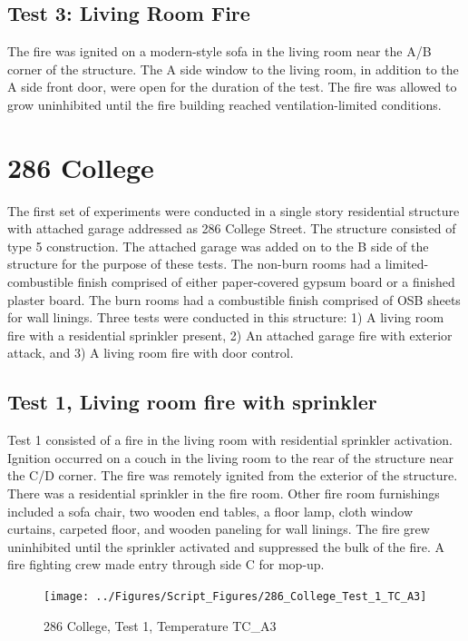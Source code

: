 \documentclass[12pt,oneside]{book}
\begin{document}
\subsection{Test 3: Living Room Fire}

The fire was ignited on a modern-style sofa in the living room near the A/B corner of the structure. The A side window to the living room, in addition to the A side front door, were open for the duration of the test. The fire was allowed to grow uninhibited until the fire building reached ventilation-limited conditions.

\section{286 College}

The first set of experiments were conducted in a single story residential structure with attached garage addressed as 286 College Street. The structure consisted of type 5 construction. The attached garage was added on to the B side of the structure for the purpose of these tests. The non-burn rooms had a limited-combustible finish comprised of either paper-covered gypsum board or a finished plaster board. The burn rooms had a combustible finish comprised of OSB sheets for wall linings. Three tests were conducted in this structure: 1) A living room fire with a residential sprinkler present, 2) An attached garage fire with exterior attack, and 3) A living room fire with door control.

\subsection{Test 1, Living room fire with sprinkler}

Test 1 consisted of a fire in the living room with residential sprinkler activation. Ignition occurred on a couch in the living room to the rear of the structure near the C/D corner. The fire was remotely ignited from the exterior of the structure. There was a residential sprinkler in the fire room. Other fire room furnishings included a sofa chair, two wooden end tables, a floor lamp, cloth window curtains, carpeted floor, and wooden paneling for wall linings. The fire grew uninhibited until the sprinkler activated and suppressed the bulk of the fire. A fire fighting crew made entry through side C for mop-up.

\begin{figure}[!ht]
\texttt{[image: ../Figures/Script\_Figures/286\_College\_Test\_1\_TC\_A3]}
\caption{286 College, Test 1, Temperature TC\_A3}
\label{fig:286_College_Test_1_TC_A3}
\end{figure}
\end{document}
